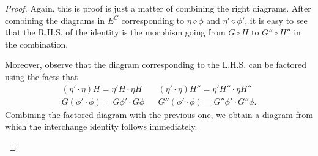 \documentclass{article}
\theoremstyle{definition}
\theoremstyle{remark}
\begin{document}
\begin{proof}
	Again, this is proof is just a matter of combining the right diagrams. After combining the diagrams in $E^C$ corresponding to $\eta \diamond \phi$ and $\eta'\diamond \phi'$, it is easy to see that the R.H.S. of the identity is the morphism going from $G\circ H$ to $G''\circ H''$ in the combination.
	\begin{figure}[H]
		\centering
	\end{figure}

	Moreover, observe that the diagram corresponding to the L.H.S. can be factored using the facts that \begin{align*}
	(\eta'\cdot \eta)H = \eta'H\cdot \eta H && (\eta'\cdot \eta)H'' = \eta'H''\cdot \eta H''\\
	G(\phi'\cdot \phi) = G\phi'\cdot G\phi && G''(\phi'\cdot \phi) = G''\phi'\cdot G''\phi.
	\end{align*}
	Combining the factored diagram with the previous one, we obtain a diagram from which the interchange identity follows immediately.
	\begin{figure}[h]
		\centering
	\end{figure}
\end{proof}
\end{document}
